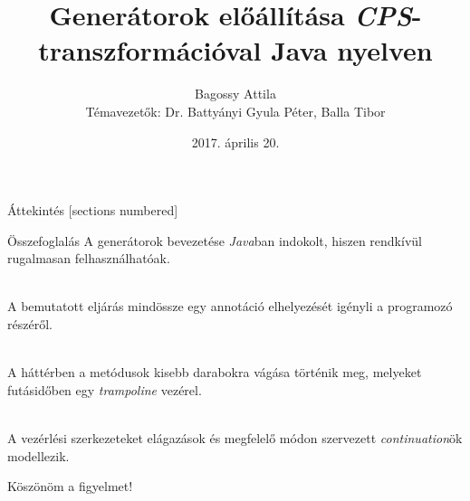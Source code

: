 \documentclass{beamer}
\title{Generátorok előállítása \textit{CPS}-transzformációval Java nyelven}
\date{2017. április 20.}
\author[My name]{Bagossy Attila\\ \footnotesize Témavezetők: Dr. Battyányi Gyula Péter, Balla Tibor \vspace{5em}}
\institute{Debreceni Egyetem, Informatikai Kar, Számítógéptudományi Tanszék}
\begin{document}
  \maketitle

  \begin{frame}{Áttekintés}
    [sections numbered]
    \tableofcontents[hideallsubsections]
  \end{frame}

  

  

  

  

  \begin{frame}{Összefoglalás}
    A generátorok bevezetése \textit{Java}ban indokolt, hiszen rendkívül rugalmasan felhasználhatóak.

    \hfill \\

    A bemutatott eljárás mindössze egy annotáció elhelyezését igényli a programozó részéről.

    \hfill \\

    A háttérben a metódusok kisebb darabokra vágása történik meg, melyeket futásidőben egy \textit{trampoline} vezérel.

    \hfill \\

    A vezérlési szerkezeteket elágazások és megfelelő módon szervezett \textit{continuation}ök modellezik.
  \end{frame}

  \begin{frame}[standout]
    Köszönöm a figyelmet!
  \end{frame}

\end{document}

